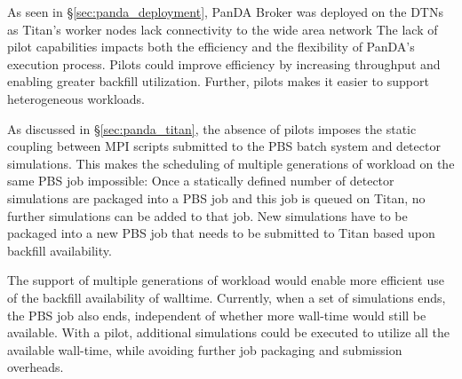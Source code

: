 

As seen in \S\ref{sec:panda_deployment}, PanDA Broker was  deployed on the
DTNs as Titan's worker nodes lack connectivity to the wide area network The
lack of pilot capabilities impacts both the efficiency and the flexibility of
PanDA's execution process. Pilots could improve efficiency by increasing
throughput and enabling greater backfill utilization. Further, pilots makes it
easier to support heterogeneous workloads.

As discussed in \S\ref{sec:panda_titan}, the absence of pilots imposes the
static coupling between MPI scripts submitted to the PBS batch system and
detector simulations. This makes the scheduling of multiple generations of
workload on the same PBS job impossible: Once a statically defined number of
detector simulations are packaged into a PBS job and this job is queued on
Titan, no further simulations can be added to that job. New simulations have
to be packaged into a new PBS job that needs to be submitted to Titan based 
upon backfill availability.

The support of  multiple generations of workload would enable more efficient
use of the backfill availability of walltime. Currently, when a set of
simulations ends, the PBS job also ends, independent of whether more wall-time
would still be available. With a pilot, additional simulations could be
executed  to utilize all the available wall-time, while avoiding further job
packaging and submission overheads.


